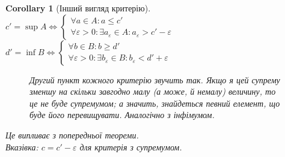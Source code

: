 \documentclass[a4paper, 14pt]{article}
\theoremstyle{theoremdd}
\theoremstyle{theoremdd}
\theoremstyle{theoremdd}
\theoremstyle{theoremdd}
\theoremstyle{theoremdd}
\theoremstyle{theoremdd}
\theoremstyle{theoremdd}
\theoremstyle{theoremdd}
\newtheorem{corollary}[theorem]{Corollary}
\begin{document}
	\begin{corollary}[Інший вигляд критерію]
	$c' = \sup A \iff \begin{cases} 
	 \forall a \in A: a \leq c' \\
	 \forall \varepsilon > 0: \exists a_{\varepsilon} \in A: a_{\varepsilon} > c' - \varepsilon
	\end{cases}$ \qquad\qquad
	$d' = \inf B \iff \begin{cases} 
	 \forall b \in B: b \geq d'\\
	 \forall \varepsilon > 0: \exists b_{\varepsilon} \in B: b_{\varepsilon} < d' + \varepsilon
	\end{cases}$
	\begin{figure}[H]
	\centering
	\qquad
	\caption*{Другий пункт кожного критерію звучить так. Якщо я цей супрему зменшу на скільки завгодно малу (а може, й немалу) величину, то це не буде супремумом; а значить, знайдеться певний елемент, що буде його перевищувати. Аналогічно з інфімумом.}
	\end{figure}
	\textit{Це випливає з попередньої теореми}.\\
	\textit{Вказівка: $c = c'-\varepsilon$ для критерія з супремумом}.
	\end{corollary}
	
\end{document}
